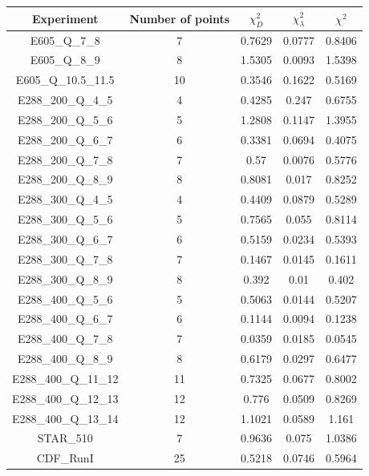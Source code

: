 \documentclass[
]{article}
\begin{document}
\begin{table}[h]

\centering

\begin{tabular}{|c|c|c|c|c|} \hline

\textbf{Experiment} & \textbf{Number of
points} & \textbf{\(\chi_{D}^2\)} & \textbf{\(\chi_{\lambda}^2\)} & \textbf{\(\chi^2\)} \\ \hline

E605\_Q\_7\_8 & 7 & 0.7629 & 0.0777 & 0.8406 \\ \hline
E605\_Q\_8\_9 & 8 & 1.5305 & 0.0093 & 1.5398 \\ \hline
E605\_Q\_10.5\_11.5 & 10 & 0.3546 & 0.1622 & 0.5169 \\ \hline
E288\_200\_Q\_4\_5 & 4 & 0.4285 & 0.247 & 0.6755 \\ \hline
E288\_200\_Q\_5\_6 & 5 & 1.2808 & 0.1147 & 1.3955 \\ \hline
E288\_200\_Q\_6\_7 & 6 & 0.3381 & 0.0694 & 0.4075 \\ \hline
E288\_200\_Q\_7\_8 & 7 & 0.57 & 0.0076 & 0.5776 \\ \hline
E288\_200\_Q\_8\_9 & 8 & 0.8081 & 0.017 & 0.8252 \\ \hline
E288\_300\_Q\_4\_5 & 4 & 0.4409 & 0.0879 & 0.5289 \\ \hline
E288\_300\_Q\_5\_6 & 5 & 0.7565 & 0.055 & 0.8114 \\ \hline
E288\_300\_Q\_6\_7 & 6 & 0.5159 & 0.0234 & 0.5393 \\ \hline
E288\_300\_Q\_7\_8 & 7 & 0.1467 & 0.0145 & 0.1611 \\ \hline
E288\_300\_Q\_8\_9 & 8 & 0.392 & 0.01 & 0.402 \\ \hline
E288\_400\_Q\_5\_6 & 5 & 0.5063 & 0.0144 & 0.5207 \\ \hline
E288\_400\_Q\_6\_7 & 6 & 0.1144 & 0.0094 & 0.1238 \\ \hline
E288\_400\_Q\_7\_8 & 7 & 0.0359 & 0.0185 & 0.0545 \\ \hline
E288\_400\_Q\_8\_9 & 8 & 0.6179 & 0.0297 & 0.6477 \\ \hline
E288\_400\_Q\_11\_12 & 11 & 0.7325 & 0.0677 & 0.8002 \\ \hline
E288\_400\_Q\_12\_13 & 12 & 0.776 & 0.0509 & 0.8269 \\ \hline
E288\_400\_Q\_13\_14 & 12 & 1.1021 & 0.0589 & 1.161 \\ \hline
STAR\_510 & 7 & 0.9636 & 0.075 & 1.0386 \\ \hline
CDF\_RunI & 25 & 0.5218 & 0.0746 & 0.5964 \\ \hline

\end{tabular}
\end{table}
\end{document}
